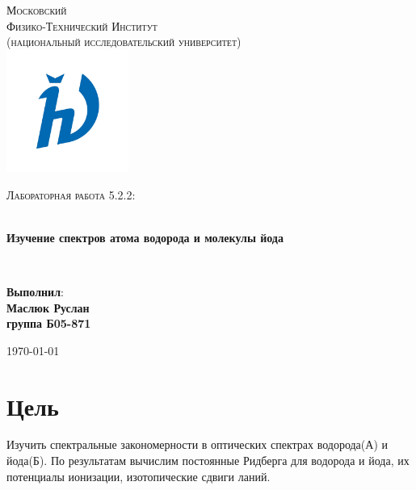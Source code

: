 \documentclass[14pt, a4paper]{extarticle}
\begin{document}


\begin{titlepage}
\begin{center}

\textsc{\LARGE Московский\\[-0.2cm]Физико-Технический Институт\\[0.1cm]\large (национальный исследовательский университет)}\\[1.5cm] 

\includegraphics[width=0.3\textwidth]{logo}

\textsc{\Large Лабораторная работа 5.2.2: \\ }

\HRule \\[0.4cm]
{ \LARGE \bfseries Изучение спектров атома водорода и молекулы йода }

\HRule \\[1.5cm]

\noindent
\begin{minipage}{0.4\textwidth}
\begin{flushleft} \large
\end{flushleft}
\end{minipage}%
\begin{minipage}{0.4\textwidth}
\begin{flushright} \large
\end{flushright}
\end{minipage}

\large{\begin{flushright}
\vfill
\textbf{Выполнил}:\\
\textbf{Маслюк Руслан\\}
\textbf{группа Б05-871}
\end{flushright}}

{\large \today}\\

\end{center}
\end{titlepage}


\section{Цель}
\label{sec:цель}
Изучить спектральные закономерности в оптических спектрах водорода(А) и йода(Б). По результатам вычислим постоянные Ридберга для водорода и йода, их потенциалы ионизации, изотопические сдвиги ланий.
\end{document}
